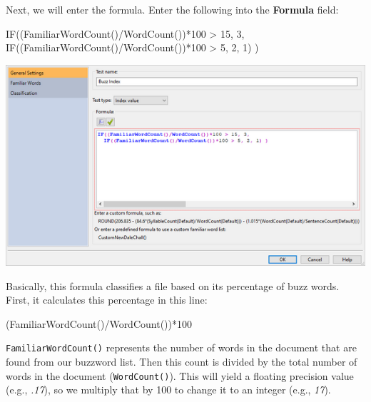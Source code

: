\documentclass[
]{book}
\newenvironment{Shaded}{\begin{snugshade}}{\end{snugshade}}
\newcommand{\DecValTok}[1]{\textcolor[rgb]{0.00,0.00,0.81}{#1}}
\newcommand{\FunctionTok}[1]{\textcolor[rgb]{0.00,0.00,0.00}{#1}}
\newcommand{\NormalTok}[1]{#1}
\newcommand{\SpecialCharTok}[1]{\textcolor[rgb]{0.00,0.00,0.00}{#1}}
\theoremstyle{definition}
\theoremstyle{definition}
\theoremstyle{definition}
\theoremstyle{definition}
\theoremstyle{remark}
\begin{document}
Next, we will enter the formula. Enter the following into the \textbf{Formula} field:

\begin{Shaded}
\begin{Highlighting}[]
\FunctionTok{IF}\NormalTok{((}\FunctionTok{FamiliarWordCount}\NormalTok{()}\SpecialCharTok{/}\FunctionTok{WordCount}\NormalTok{())}\SpecialCharTok{*}\DecValTok{100} \SpecialCharTok{\textgreater{}} \DecValTok{15}\NormalTok{, }\DecValTok{3}\NormalTok{,  }
   \FunctionTok{IF}\NormalTok{((}\FunctionTok{FamiliarWordCount}\NormalTok{()}\SpecialCharTok{/}\FunctionTok{WordCount}\NormalTok{())}\SpecialCharTok{*}\DecValTok{100} \SpecialCharTok{\textgreater{}} \DecValTok{5}\NormalTok{, }\DecValTok{2}\NormalTok{, }\DecValTok{1}\NormalTok{) )}
\end{Highlighting}
\end{Shaded}

\includegraphics{Images/CustomIndexTestExampleFormula.png}

Basically, this formula classifies a file based on its percentage of buzz words. First, it calculates this percentage in this line:

\begin{Shaded}
\begin{Highlighting}[]
\NormalTok{(}\FunctionTok{FamiliarWordCount}\NormalTok{()}\SpecialCharTok{/}\FunctionTok{WordCount}\NormalTok{())}\SpecialCharTok{*}\DecValTok{100}
\end{Highlighting}
\end{Shaded}

\texttt{FamiliarWordCount()} represents the number of words in the document that are found from our buzzword list. Then this count is divided by the total number of words in the document (\texttt{WordCount()}). This will yield a floating precision value (e.g., \emph{.17}), so we multiply that by 100 to change it to an integer (e.g., \emph{17}).
\end{document}
